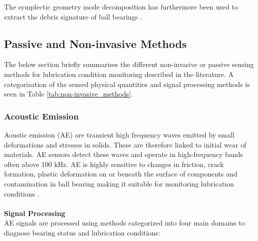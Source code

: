 The symplectic geometry mode decomposition has furthermore been used to extract the debris signature of ball bearings \cite{yu_novel_2021}.

\subsection{Passive and Non-invasive Methods}
The below section briefly summarises the different non-invasive or passive sensing methods for lubrication condition monitoring described in the literature. A categorization of the sensed physical quantities and signal processing methods is seen in Table \ref{tab:non-invasive_methods}.

\subsubsection{Acoustic Emission}
Aoustic emission (AE) are transient high frequency waves emitted by small deformations and stresses in solids. These are therefore linked to initial wear of materials. AE sensors detect these waves and operate in high-frequency bands often above 100 kHz. AE is highly sensitive to changes in friction, crack formation, plastic deformation on or beneath the surface of components and contamination in ball bearing making it suitable for monitoring lubrication conditions \cite{hou_-situ_2025} \cite{delft_university_of_technology_tu_delft_influence_2024} \cite{wang_advanced_2024} \cite{scheeren_acoustic_2024}.
\\\\
\textbf{Signal Processing}\\
AE signals are processed using methods categorized into four main domains to diagnose bearing status and lubrication conditions:
